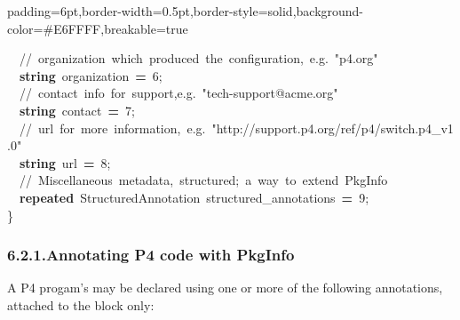 \documentclass[11pt]{article}
\begin{document}
{\begin{mdbmargintb}{6pt}{6pt}
\begin{mdblock}{padding=6pt,border-width=0.5pt,border-style=solid,background-color=\#E6FFFF,breakable=true}
\begin{mdpre}
{{~~{//~organization~which~produced~the~configuration,~e.g.~"p4.org"}\\
~~{\bfseries{string}}~organization~{\bfseries{=}}~{6};\\
~~{//~contact~info~for~support,e.g.~"tech-support@acme.org"}\\
~~{\bfseries{string}}~contact~{\bfseries{=}}~{7};\\
~~{//~url~for~more~information,~e.g.~"http://support.p4.org/ref/p4/switch.p4\_v1.0"}\\
~~{\bfseries{string}}~url~{\bfseries{=}}~{8};\\
~~{//~Miscellaneous~metadata,~structured;~a~way~to~extend~PkgInfo}\\
~~{\bfseries{repeated}}~StructuredAnnotation~structured\_annotations~{\bfseries{=}}~{9};\\
\}}}%
\end{mdpre}%
\end{mdblock}%
\end{mdbmargintb}%

\subsubsection{6.2.1.\hspace*{0.5em}Annotating P4 code with PkgInfo}\label{sec-annotating-p4-code-with-pkginfo}%

\noindent{}A P4 progam's  may be declared using one or more of the following
annotations, attached to the  block only:%

}
\end{document}
